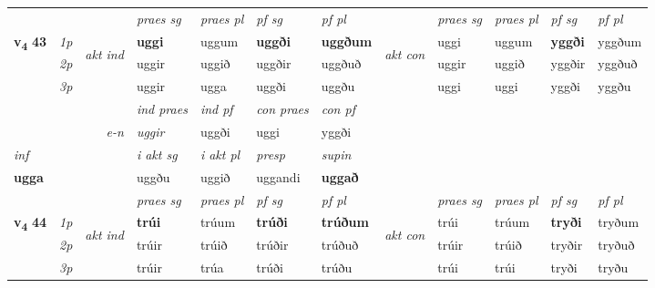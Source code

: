 \begin{longtable}[l]{X>{\footnotesize\itshape}llXXXXlXXXX}
 & &   & \textit{praes sg}  & \textit{praes pl}    & \textit{ pf sg} & \textit{pf pl} & & \textit{praes sg}  & \textit{praes pl}    & \textit{pf sg} & \textit{pf pl }  \\ \cmidrule{4-7} \cmidrule{9-12}
 \multirow{2}{*}{{{\textbf{v{\textsubscript{4}}} \Large{\textbf{43}}}}}  & 1p & \multirow{3}{*}{\begin{turn}{90}\textit{akt ind}\end{turn}} & \textbf{uggi} & uggum & \textbf{uggði} & \textbf{uggðum} & \multirow{3}{*}{\begin{turn}{90}\textit{akt con}\end{turn}} &uggi & uggum & \textbf{yggði} & yggðum\\*
 & 2p &  &  uggir  & uggið & uggðir & uggðuð & & uggir & uggið & yggðir & yggðuð \\*
 & 3p &  & uggir & ugga & uggði & uggðu & & uggi & uggi& yggði & yggðu \\*
\cmidrule{4-7} \cmidrule{9-12}

   && &  \textit{ind praes} & \textit{ind pf} & \textit{con praes} & \textit{con pf} \\*
\multicolumn{3}{r}{\textit{e-n}} & uggir & uggði & uggi & yggði \\*

\cmidrule{4-7}
   {\textit{inf}} & &  & \textit{i akt sg} & \textit{i akt pl}   & \textit{presp} & \textit{supin}   \\*
  {\textbf{ugga}} & && uggðu  & uggið   & uggandi &  \textbf{uggað}   \\*

\midrule

 & &   & \textit{praes sg}  & \textit{praes pl}    & \textit{ pf sg} & \textit{pf pl} & & \textit{praes sg}  & \textit{praes pl}    & \textit{pf sg} & \textit{pf pl }  \\ \cmidrule{4-7} \cmidrule{9-12}
 \multirow{2}{*}{{{\textbf{v{\textsubscript{4}}} \Large{\textbf{44}}}}}  & 1p & \multirow{3}{*}{\begin{turn}{90}\textit{akt ind}\end{turn}} & \textbf{trúi} & trúum & \textbf{trúði} & \textbf{trúðum} & \multirow{3}{*}{\begin{turn}{90}\textit{akt con}\end{turn}} &trúi & trúum & \textbf{tryði} & tryðum\\*
 & 2p &  &  trúir  & trúið & trúðir & trúðuð & & trúir & trúið & tryðir & tryðuð \\*
 & 3p &  & trúir & trúa & trúði & trúðu & & trúi & trúi& tryði & tryðu \\*
\cmidrule{4-7} \cmidrule{9-12}


\end{longtable}
